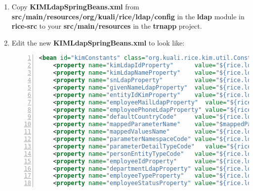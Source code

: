 \begin{enumerate}
\item Copy \textbf{KIMLdapSpringBeans.xml} from
  \textbf{src/main/resources/org/kuali/rice/ldap/config} in the
  \textbf{ldap} module in \textbf{rice-src} to your
  \textbf{src/main/resources} in the \textbf{trnapp} project.



\item Edit the new \textbf{KIMLdapSpringBeans.xml} to look like:

\begin{lstlisting}[numbers=left,language=xml,basicstyle=\scriptsize,backgroundcolor=\color{ubergray},caption={trnapp/src/main/resources/KIMLdapSpringBeans.xml},frame=single,breaklines=true]
	<bean id="kimConstants" class="org.kuali.rice.kim.util.ConstantsImpl">
  	<property name="kimLdapIdProperty"     	value="${rice.ldap.param.kimLdapIdProperty}" />
  	<property name="kimLdapNameProperty"   	value="${rice.ldap.param.kimLdapNameProperty}" />
  	<property name="snLdapProperty"        	value="${rice.ldap.param.snLdapProperty}" />
  	<property name="givenNameLdapProperty" 	value="${rice.ldap.param.givenNameLdapProperty}" />
  	<property name="entityIdKimProperty"   	value="${rice.ldap.param.entityIdKimProperty}" />
  	<property name="employeeMailLdapProperty"  value="${rice.ldap.param.employeeMailLdapProperty}" />
  	<property name="employeePhoneLdapProperty" value="${rice.ldap.param.employeePhoneLdapProperty}" />
  	<property name="defaultCountryCode"    	value="${rice.ldap.param.defaultCountryCode}" />
  	<property name="mappedParameterName"   	value="$mappedParameterName}" />
  	<property name="mappedValuesName"      	value="${rice.ldap.param.mappedValuesName}" />
  	<property name="parameterNamespaceCode"	value="${rice.ldap.param.parameterNamespaceCode}" />
  	<property name="parameterDetailTypeCode"   value="${rice.ldap.param.parameterDetailTypeCode}" />
  	<property name="personEntityTypeCode"  	value="${rice.ldap.param.personEntityTypeCode}" />
  	<property name="employeeIdProperty"    	value="${rice.ldap.param.employeeIdPropertyd}" />
  	<property name="departmentLdapProperty"	value="${rice.ldap.param.departmentNumber}" />  
  	<property name="employeeTypeProperty"  	value="${rice.ldap.param.employeeTypeProperty}" />
  	<property name="employeeStatusProperty"	value="${rice.ldap.param.employeeStatusProperty}" />

\end{lstlisting}
\end{enumerate}
